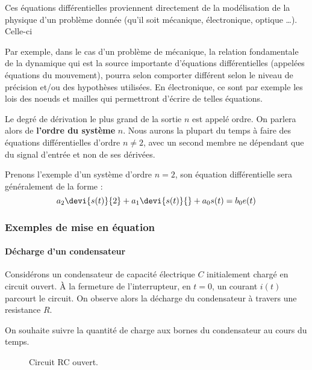Ces équations différentielles proviennent directement de la modélisation 
de la physique d'un problème donnée (qu'il soit mécanique, électronique, optique \ldots).
Celle-ci 

Par exemple, dans le cas d'un problème de mécanique, 
la relation fondamentale de la dynamique qui est 
la source importante d'équations différentielles (appelées équations du mouvement), pourra selon 
comporter différent selon le niveau de précision et/ou des hypothèses utilisées. 
En électronique, ce sont par exemple les lois des noeuds et mailles qui 
permettront d'écrire de telles équations. 

Le degré de dérivation le plus grand de la sortie $n$ est appelé ordre. 
On parlera alors de \textbf{l'ordre du système} $n$.
Nous aurons la plupart du temps à faire des équations différentielles
d'ordre $n\ne2$, avec un second membre ne dépendant que du signal d'entrée et non de ses dérivées.

Prenons l'exemple d'un système d'ordre $n=2$, son équation différentielle 
sera généralement de la forme :
$$
a_2\devi{s(t)}{2}+a_1\devi{s(t)}{}+a_0 s(t)=b_0e(t)
$$

\subsubsection{Exemples de mise en équation}

\paragraph{Décharge d'un condensateur}

Considérons un condensateur de capacité électrique $C$ 
initialement chargé en circuit ouvert.
À la fermeture de l'interrupteur, en $t=0$, 
un courant $i(t)$ parcourt le circuit.
On observe alors la décharge du condensateur à travers une resistance $R$. 

On souhaite suivre la quantité de charge aux bornes du condensateur au 
cours du temps.
\begin{figure}[!h]      
    \centering
    
    \caption{Circuit RC ouvert.\label{fig-decharge_condensateur}}
\end{figure}

